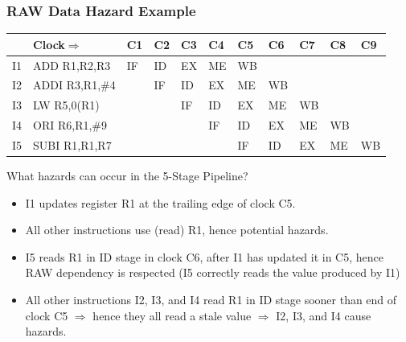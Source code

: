 \documentclass{beamer}
\renewcommand{\emph}[1]{\textcolor{structure}{#1}}
\newcommand{\emp}[1]{\textcolor{DikuRed}{ #1}}
\begin{document}
\begin{frame}[fragile,t]
\frametitle{RAW Data Hazard Example}

\bigskip

\begin{scriptsize}
\begin{tabular}{lllllllllll}
\hline
   & Clock$\Rightarrow$ & C1 & C2 & C3 & C4 & C5 & C6 & C7 & C8 & C9 \\\hline
I1 & ADD  R1,R2,R3      & IF & ID & EX & \emph{ME} & \emp{WB} &    &    &    &    \\
I2 & ADDI R3,R1,\#4     &    & IF & \alert{ID} & \emph{EX} & ME & WB &    &    &    \\
I3 & LW   R5,0(R1)      &    &    & IF & \alert{ID} & \emph{EX} & ME & WB &    &    \\
I4 & ORI  R6,R1,\#9     &    &    &    & IF & \alert{ID} & \emph{EX} & ME & WB &    \\
I5 & SUBI R1,R1,R7      &    &    &    &    & IF & ID & EX & ME & WB \\\hline
\end{tabular}
\end{scriptsize} 

\bigskip

\begin{scriptsize}
What hazards can occur in the 5-Stage Pipeline?
\begin{itemize}
\item I1 updates register R1 at the trailing edge of clock C5. \smallskip
\item All other instructions use (read) R1, hence potential hazards.
\item I5 reads R1 in ID stage in clock C6, after I1 has updated it in C5,
            hence RAW dependency is respected (\emph{I5 correctly reads the
            value produced by I1})\smallskip
\item All other instructions I2, I3, and I4 read R1 in ID stage sooner than
            end of clock C5 $\Rightarrow$ hence they all read a stale value 
            $\Rightarrow$ \alert{I2, I3, and I4 cause hazards}. 
\end{itemize}
\end{scriptsize}

\end{frame}
\end{document}
